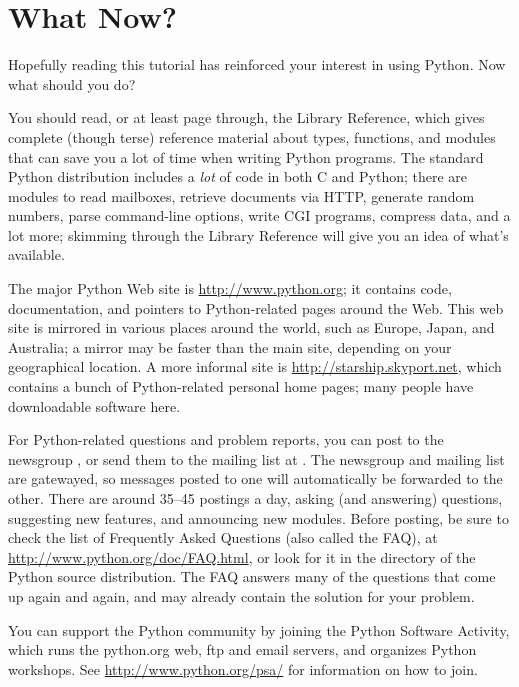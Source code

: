 \documentclass{manual}
\begin{document}
\chapter{What Now? \label{whatNow}}

Hopefully reading this tutorial has reinforced your interest in using
Python.  Now what should you do?

You should read, or at least page through, the Library Reference,
which gives complete (though terse) reference material about types,
functions, and modules that can save you a lot of time when writing
Python programs.  The standard Python distribution includes a
\emph{lot} of code in both C and Python; there are modules to read
\UNIX{} mailboxes, retrieve documents via HTTP, generate random
numbers, parse command-line options, write CGI programs, compress
data, and a lot more; skimming through the Library Reference will give
you an idea of what's available.

The major Python Web site is \url{http://www.python.org}; it contains
code, documentation, and pointers to Python-related pages around the
Web.  This web site is mirrored in various places around the
world, such as Europe, Japan, and Australia; a mirror may be faster
than the main site, depending on your geographical location.  A more
informal site is \url{http://starship.skyport.net}, which contains a
bunch of Python-related personal home pages; many people have
downloadable software here.

For Python-related questions and problem reports, you can post to the
newsgroup , or send them to the mailing
list at .  The newsgroup and mailing list
are gatewayed, so messages posted to one will automatically be
forwarded to the other.  There are around 35--45 postings a day,
asking (and answering) questions, suggesting new features, and
announcing new modules.  Before posting, be sure to check the list of
Frequently Asked Questions (also called the FAQ), at
\url{http://www.python.org/doc/FAQ.html}, or look for it in the
 directory of the Python source distribution.  The FAQ
answers many of the questions that come up again and again, and may
already contain the solution for your problem.

You can support the Python community by joining the Python Software
Activity, which runs the python.org web, ftp and email servers, and
organizes Python workshops.  See \url{http://www.python.org/psa/} for
information on how to join.
\end{document}
